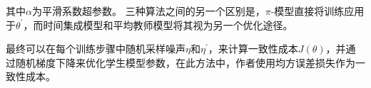\documentclass[lang=chs, degree=master, blindreview=false, adobe=false]{yanputhesis}
\begin{document}
其中$\alpha$为平滑系数超参数。 三种算法之间的另一个区别是，$\pi$-模型直接将训练应用于$\theta^{\prime}$，而时间集成模型和平均教师模型将其视为另一个优化途径。

最终可以在每个训练步骤中随机采样噪声$\eta$和$\eta^{\prime}$，来计算一致性成本$J(\theta)$，并通过随机梯度下降来优化学生模型参数，在此方法中，作者使用均方误差损失作为一致性成本。

\end{document}
